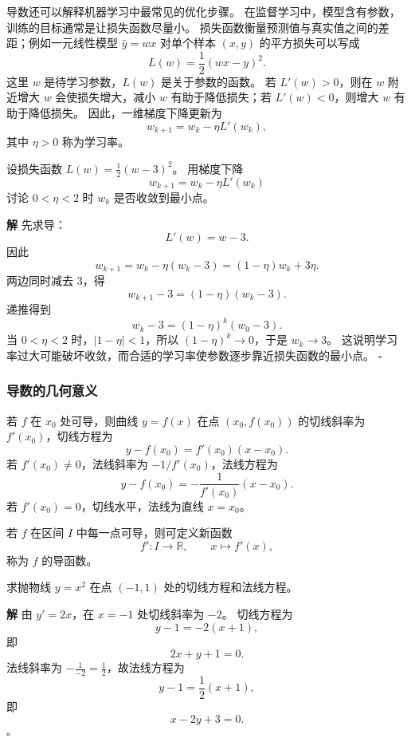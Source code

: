 \documentclass[fontset=fandol]{ctexart}
\newenvironment{solution}{\par\noindent\textbf{解}\quad}{\hfill$\square$\par\vspace{0.8em}}
\newcommand{\RR}{\mathbb{R}}
\begin{document}
\begin{application}[导数与梯度下降的基本思想]
	
	导数还可以解释机器学习中最常见的优化步骤。 在监督学习中，模型含有参数，训练的目标通常是让损失函数尽量小。 损失函数衡量预测值与真实值之间的差距；例如一元线性模型 $\hat y=wx$ 对单个样本 $(x,y)$ 的平方损失可以写成
	\[
	L(w)=\frac12(wx-y)^2.
	\]
	这里 $w$ 是待学习参数，$L(w)$ 是关于参数的函数。 若 $L'(w)>0$，则在 $w$ 附近增大 $w$ 会使损失增大，减小 $w$ 有助于降低损失；若 $L'(w)<0$，则增大 $w$ 有助于降低损失。 因此，一维梯度下降更新为
	\[
	w_{k+1}=w_k-\eta L'(w_k),
	\]
	其中 $\eta>0$ 称为学习率。
	
	\begin{example}
		设损失函数 $L(w)=\frac12(w-3)^2$。 用梯度下降
		\[
		w_{k+1}=w_k-\eta L'(w_k)
		\]
		讨论 $0<\eta<2$ 时 $w_k$ 是否收敛到最小点。
	\end{example}
	\begin{solution}
		先求导：
		\[
		L'(w)=w-3.
		\]
		因此
		\[
		w_{k+1}=w_k-\eta(w_k-3)=(1-\eta)w_k+3\eta.
		\]
		两边同时减去 $3$，得
		\[
		w_{k+1}-3=(1-\eta)(w_k-3).
		\]
		递推得到
		\[
		w_k-3=(1-\eta)^k(w_0-3).
		\]
		当 $0<\eta<2$ 时，$|1-\eta|<1$，所以 $(1-\eta)^k\to0$，于是 $w_k\to3$。 这说明学习率过大可能破坏收敛，而合适的学习率使参数逐步靠近损失函数的最小点。
	\end{solution}
	
\end{application}


\subsubsection*{导数的几何意义}

\begin{definition}[切线与法线]
若 $f$ 在 $x_0$ 处可导，则曲线 $y=f(x)$ 在点 $(x_0,f(x_0))$ 的切线斜率为 $f'(x_0)$，切线方程为
\[
y-f(x_0)=f'(x_0)(x-x_0).
\]
若 $f'(x_0)\neq0$，法线斜率为 $-1/f'(x_0)$，法线方程为
\[
y-f(x_0)=-\frac{1}{f'(x_0)}(x-x_0).
\]
若 $f'(x_0)=0$，切线水平，法线为直线 $x=x_0$。
\end{definition}

\begin{definition}[导函数]
若 $f$ 在区间 $I$ 中每一点可导，则可定义新函数
\[
f':I\to\RR,\qquad x\mapsto f'(x),
\]
称为 $f$ 的导函数。
\end{definition}

\begin{example}[切线与法线]
求抛物线 $y=x^2$ 在点 $(-1,1)$ 处的切线方程和法线方程。
\end{example}
\begin{solution}
由 $y'=2x$，在 $x=-1$ 处切线斜率为 $-2$。 切线方程为
\[
y-1=-2(x+1),
\]
即
\[
2x+y+1=0.
\]
法线斜率为 $-\frac1{-2}=\frac12$，故法线方程为
\[
y-1=\frac12(x+1),
\]
即
\[
x-2y+3=0.
\]
\end{solution}
\end{document}
